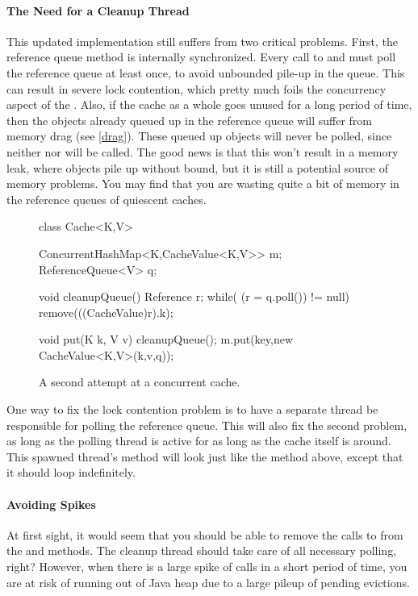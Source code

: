 \paragraph{The Need for a Cleanup Thread}
This updated implementation still suffers from two critical problems. First, the
reference queue  method is internally synchronized. Every call to
 and  must poll the reference queue at least once, to avoid
unbounded pile-up in the queue. This can result in severe lock contention, which
pretty much foils the concurrency aspect of the .
Also, if the cache as a whole goes unused for a long period of time, then the
objects already queued up in the reference queue will suffer from memory drag
(see \autoref{drag}). These queued up objects will never be polled, since
neither  nor  will be called. The good news is that this
won't result in a memory leak, where objects pile up without bound, but it is
still a potential source of memory problems. You may find that you are wasting
quite a bit of memory in the reference queues of quiescent caches.


\begin{wrapfigure}[18]{l}{0.61\textwidth}
\centering
\begin{figurelisting}
class Cache<K,V> {
  ConcurrentHashMap<K,CacheValue<K,V>> m;
  ReferenceQueue<V> q;
   
  void cleanupQueue() {
    Reference r;
    while( (r = q.poll()) != null)
       remove(((CacheValue)r).k);
  }
   
  void put(K k, V v) {
    cleanupQueue();
    m.put(key,new CacheValue<K,V>(k,v,q));
  }
}
\end{figurelisting}
\caption{A second attempt at a concurrent cache.}
\label{fig:concurrent-cache-second-attempt}
\end{wrapfigure}

One way to fix the lock contention problem is to have a separate thread be
responsible for polling the reference queue. This will also fix the second
problem, as long as the polling thread is active for as long as the cache itself
is around. This spawned thread's  method will look just like the
 method above, except that it should loop indefinitely.

\paragraph{Avoiding Spikes}
At first sight, it would seem that you should be able to remove the calls to
 from the  and  methods. The cleanup
thread should take care of all necessary polling, right? However, when there is
a large spike of  calls in a short period of time, you are at risk of
running out of Java heap due to a large pileup of pending evictions.

